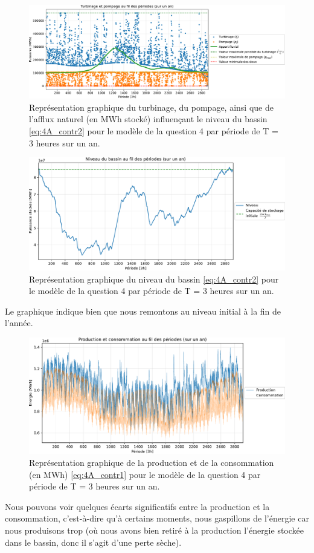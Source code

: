 \documentclass{article}
\begin{document}
\begin{figure}[h!]
    \centering
    \includegraphics[scale=0.6]{GraphesP2/Turbinage_pompage_Q4.pdf}
    \caption{Représentation graphique du turbinage, du pompage, ainsi que de l'afflux naturel (en MWh stocké)
    influençant le niveau du bassin \eqref{eq:4A_contr2} pour le modèle de la question 4 par période de T = 3 heures sur un an.}
    \label{fig:Turbinage_pompage_Q4}
\end{figure}
\newpage
\begin{figure}[h!]
    \centering
    \includegraphics[scale=0.6]{GraphesP2/Niveau_Bassin_Q4.pdf}
    \caption{Représentation graphique du niveau du bassin \eqref{eq:4A_contr2} pour le modèle 
    de la question 4 par période de T = 3 heures sur un an.}
    \label{fig:Niveau_bassin_Q4}
\end{figure}
Le graphique indique bien que nous remontons au niveau initial à la fin de l'année.
\begin{figure}[h!]
    \centering
    \includegraphics[scale=0.6]{GraphesP2/Prod_Cons_Q4.pdf}
    \caption{Représentation graphique de la production et de la consommation (en MWh) \eqref{eq:4A_contr1} pour le modèle de la question 4 
    par période de T = 3 heures sur un an.}
    \label{fig:Prod_Cons_Q4}
\end{figure}
Nous pouvons voir quelques écarts significatifs entre la production et la consommation, c'est-à-dire qu'à certains moments, nous gaspillons 
de l'énergie car nous produisons trop (où nous avons bien retiré à la production l'énergie stockée dans le bassin, donc il s'agit d'une perte sèche).
\end{document}
